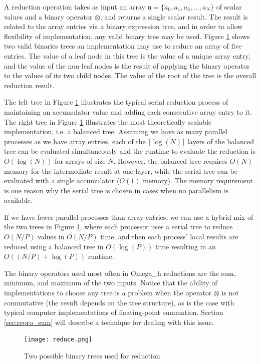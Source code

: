 A reduction operation takes as input an array
$\mathbf{a}=\{a_0,a_1,a_2,...,a_N\}$ of scalar values and
a binary operator $\otimes$, and returns a single scalar result.
The result is related to the array entries via a binary expression tree,
and in order to allow flexibility of implementation, any valid binary
tree may be used.
Figure \ref{fig:reduce} shows two valid binaries trees an implementation
may use to reduce an array of five entries.
The value of a leaf node in this tree is the value of a unique array entry,
and the value of the non-leaf nodes is the result of applying
the binary operator to the values of its two child nodes.
The value of the root of the tree is the overall reduction result.

The left tree in Figure \ref{fig:reduce} illustrates the typical
serial reduction process of maintaining an accumulator value and
adding each consecutive array entry to it.
The right tree in Figure \ref{fig:reduce} illustrates the most theoretically
scalable implementation, i.e. a balanced tree.
Assuming we have as many parallel processes as we have array entries,
each of the $\lceil\log(N)\rceil$ layers of the balanced tree
can be evaluated simultaneously and the
runtime to evaluate the reduction is $O(\log(N))$ for arrays of size $N$.
However, the balanced tree requires $O(N)$ memory for the intermediate
result at one layer, while the serial tree can be evaluated with
a single accumulator ($O(1)$ memory).
The memory requirement is one reason why the serial tree is chosen
in cases when no parallelism is available.

If we have fewer parallel processes than array entries, we can use a hybrid mix
of the two trees in Figure \ref{fig:reduce}, where each processor
uses a serial tree to reduce $O(N/P)$ values in $O(N/P)$ time, and
then each process' local results are reduced using a balanced tree
in $O(\log(P))$ time resulting in an $O((N/P)+\log(P))$ runtime.

The binary operators used most often in Omega\_h reductions
are the sum, minimum, and maximum of the two inputs.
Notice that the ability of implementations to choose any tree
is a problem when the operator $\otimes$ is not commutative
(the result depends on the tree structure),
as is the case with typical computer implementations of floating-point summation.
Section \ref{sec:repro_sum} will describe a technique for dealing
with this issue.

\begin{figure}
\begin{center}
\texttt{[image: reduce.png]}
\caption{Two possible binary trees used for reduction}
\label{fig:reduce}
\end{center}
\end{figure}

